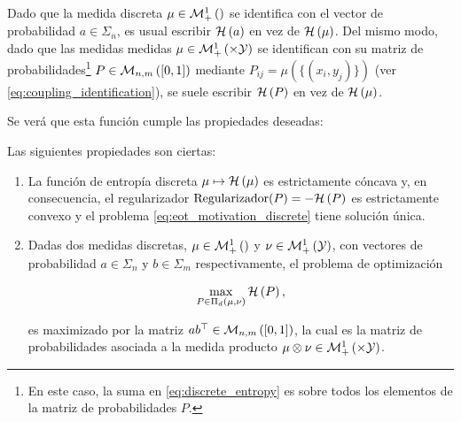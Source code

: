 Dado que la medida discreta $\mu\in\mathcal{M}_+^1\left(\right)$ se identifica con el vector de probabilidad $a\in\Sigma_n$, es usual escribir $\mathcal{H}\left(a\right)$ en vez de $\mathcal{H}\left(\mu\right)$. Del mismo modo, dado que las medidas medidas $\mu\in\probmeasure{\xspace\times\yspace}$ se identifican con su matriz de probabilidades\footnote{En este caso, la suma en \eqref{eq:discrete_entropy} es sobre todos los elementos de la matriz de probabilidades $P$.} $P\in\mathcal{M}_{n,m}\left([0,1]\right)$ mediante $P_{ij}=\mu(\{(x_i,y_j)\})$ (ver \eqref{eq:coupling_identification}), se suele escribir $\mathcal{H}\left(P\right)$ en vez de $\mathcal{H}\left(\mu\right)$.

Se verá que esta función cumple las propiedades deseadas:

\begin{prop}
	\label{prop:discrete_entropy_properties}
	Las siguientes propiedades son ciertas:

	\begin{enumerate}
		\item La función de entropía discreta $\mu\mapsto \mathcal{H}\left(\mu\right)$ es estrictamente cóncava y, en consecuencia, el regularizador $\operatorname{Regularizador}(P)=-\mathcal{H}\left(P\right)$ es estrictamente convexo y el problema \eqref{eq:eot_motivation_discrete} tiene solución única.

		\item Dadas dos medidas discretas, $\mu\in\mathcal{M}_+^1\left(\right)$ y $\nu\in\mathcal{M}_+^1\left(\mathcal{Y}\right)$, con vectores de probabilidad $a\in\Sigma_n$ y $b\in\Sigma_m$ respectivamente, el problema de optimización

		      \begin{equation}
			      \label{eq:entropy_maximizer}
			      \max_{P\in\Pi_d(\mu,\nu)} \mathcal{H}\left(P\right),
		      \end{equation}

		      es maximizado por la matriz $ab^\top\in\mathcal{M}_{n,m}\left([0,1]\right)$, la cual es la matriz de probabilidades asociada a la medida producto $\mu\otimes\nu\in\probmeasure{\xspace\times\yspace}$.
	\end{enumerate}
\end{prop}

